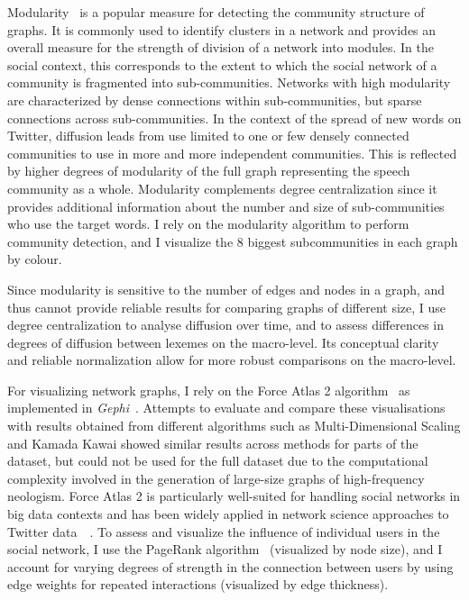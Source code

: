 \documentclass[
  a4paper,
  abstract=on,
  captions=tableabove,
  ]{scrartcl}
\begin{document}
  Modularity~\parencite{Blondel2008FastUnfolding} is a popular measure for detecting the community structure of graphs. It is commonly used to identify clusters in a network and provides an overall measure for the strength of division of a network into modules. In the social context, this corresponds to the extent to which the social network of a community is fragmented into sub-communities. Networks with high modularity are characterized by dense connections within sub-communities, but sparse connections across sub-communities. In the context of the spread of new words on Twitter, diffusion leads from use limited to one or few densely connected communities to use in more and more independent communities. This is reflected by higher degrees of modularity of the full graph representing the speech community as a whole. Modularity complements degree centralization since it provides additional information about the number and size of sub-communities who use the target words. I rely on the modularity algorithm to perform community detection, and I visualize the 8 biggest subcommunities in each graph by colour.

  Since modularity is sensitive to the number of edges and nodes in a graph, and thus cannot provide reliable results for comparing graphs of different size, I use degree centralization to analyse diffusion over time, and to assess differences in degrees of diffusion between lexemes on the macro-level. Its conceptual clarity and reliable normalization allow for more robust comparisons on the macro-level.

  For visualizing network graphs, I rely on the Force Atlas 2 algorithm~\parencite{Jacomy2014ForceAtlas2Continuous} as implemented in \emph{Gephi}~\parencite{Bastian2009GephiOpen}. Attempts to evaluate and compare these visualisations with results obtained from different algorithms such as Multi-Dimensional Scaling and Kamada Kawai showed similar results across methods for parts of the dataset, but could not be used for the full dataset due to the computational complexity involved in the generation of large-size graphs of high-frequency neologism. Force Atlas 2 is particularly well-suited for handling social networks in big data contexts and has been widely applied in network science approaches to Twitter data~ \parencite{Bruns2012HowLong,Gerlitz2013MiningOne,Bliss2012TwitterReciprocal}. To assess and visualize the influence of individual users in the social network, I use the PageRank algorithm~\parencite{Brin1998AnatomyLargeScale} (visualized by node size), and I account for varying degrees of strength in the connection between users by using edge weights for repeated interactions (visualized by edge thickness).
\end{document}
